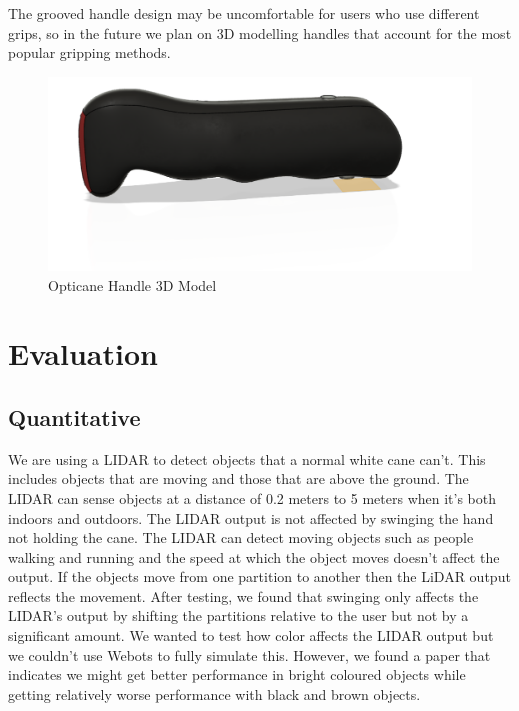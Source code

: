\documentclass{article}
\begin{document}
The grooved handle design may be uncomfortable for users who use different grips, so in the future we plan on 3D modelling handles that account for the most popular gripping methods.

\begin{figure}[tb]
\vskip 5mm
\begin{center}
\centerline{\includegraphics[width=\columnwidth]{figs/opticane-model.png}}
\caption{Opticane Handle 3D Model}
\label{fig:handle-model}
\end{center}
\vskip -5mm
\end{figure} 

\section{Evaluation}

\subsection{Quantitative}

We are using a LIDAR to detect objects that a normal white cane can't. This includes objects that are moving and those that are above the ground. The LIDAR can sense objects at a distance of 0.2 meters to 5 meters when it’s both indoors and outdoors. The LIDAR output is not affected by swinging the hand not holding the cane. The LIDAR can detect moving objects such as people walking and running and the speed at which the object moves doesn't affect the output. If the objects move from one partition to another then the LiDAR output reflects the movement. After testing, we found that swinging only affects the LIDAR’s output by shifting the partitions relative to the user but not by a significant amount. We wanted to test how color affects the LIDAR output but we couldn’t use Webots to fully simulate this. However, we found a paper that indicates we might get better performance in bright coloured objects while getting relatively worse performance with black and brown objects. \cite{bolkasMartinez2017}
\end{document}

